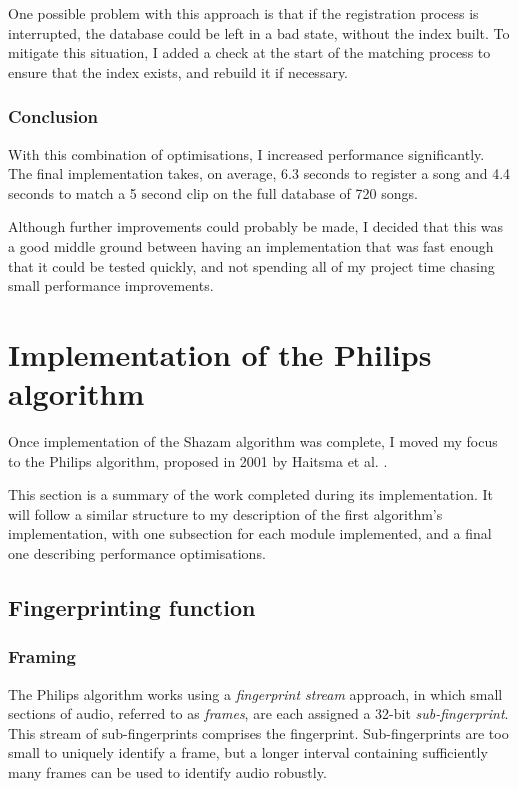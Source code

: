 \documentclass[12pt,a4paper,twoside,openright]{report}
\begin{document}
One possible problem with this approach is that if the registration process is interrupted, the database could be left in a bad state, without the index built. To mitigate this situation, I added a check at the start of the matching process to ensure that the index exists, and rebuild it if necessary.

\subsubsection{Conclusion}

With this combination of optimisations, I increased performance significantly. The final implementation takes, on average, 6.3 seconds to register a song and 4.4 seconds to match a 5 second clip on the full database of 720 songs.

Although further improvements could probably be made, I decided that this was a good middle ground between having an implementation that was fast enough that it could be tested quickly, and not spending all of my project time chasing small performance improvements.


\section{Implementation of the Philips algorithm}
\label{section:philips}

Once implementation of the Shazam algorithm was complete, I moved my focus to the Philips algorithm, proposed in 2001 by Haitsma et al. \cite{Haitsma02}. 

This section is a summary of the work completed during its implementation. It will follow a similar structure to my description of the first algorithm's implementation, with one subsection for each module implemented, and a final one describing performance optimisations.


\subsection{Fingerprinting function}
\label{philips:fingerprinter}

\subsubsection{Framing}

The Philips algorithm works using a \textit{fingerprint stream} approach, in which small sections of audio, referred to as \textit{frames}, are each assigned a 32-bit \textit{sub-fingerprint}. This stream of sub-fingerprints comprises the fingerprint. Sub-fingerprints are too small to uniquely identify a frame, but a longer interval containing sufficiently many frames can be used to identify audio robustly.
\end{document}
